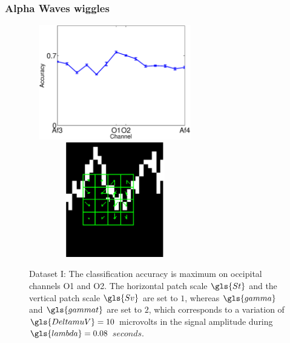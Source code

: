 \documentclass[aspectratio=169]{beamer}
\begin{document}
\begin{frame}
\frametitle{Alpha Waves wiggles}
\begin{figure}[h!]
\centering
\includegraphics[width=7.5cm, height=5cm]{images/Dataset1AccuracyPerChannel}
\includegraphics[width=7.5cm, height=5cm]{images/AlphaWaveSampleEEG.png}
\caption[Dataset I Classification Rate]{Dataset I: The classification accuracy is maximum on occipital channels O1 and O2. The horizontal patch scale $\gls{St}$ and the vertical patch scale $\gls{Sv}$ are set to $1$, whereas $\gls{gamma}$ and $\gls{gammat}$ are set to $2$, which corresponds to a variation of $\gls{DeltamuV} = 10$ microvolts in the signal amplitude during $\gls{lambda}=0.08$ $\si{seconds}$.}
\label{fig:alpharesultsdataseti}
\end{figure}
\end{frame}
\end{document}
